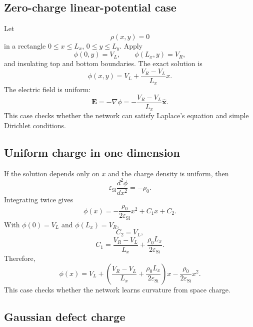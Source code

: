 \documentclass[11pt]{article}
\newcommand{\Evec}{\mathbf{E}}
\newcommand{\epss}{\varepsilon_{\mathrm{Si}}}
\begin{document}
\subsection{Zero-charge linear-potential case}

Let
\begin{equation}
\rho(x,y)=0
\end{equation}
in a rectangle $0\le x\le L_x$, $0\le y\le L_y$. Apply
\begin{equation}
\phi(0,y)=V_L,
\qquad
\phi(L_x,y)=V_R,
\end{equation}
and insulating top and bottom boundaries. The exact solution is
\begin{equation}
\phi(x,y)=V_L+\frac{V_R-V_L}{L_x}x.
\end{equation}
The electric field is uniform:
\begin{equation}
\Evec=-\nabla\phi=-\frac{V_R-V_L}{L_x}\hat{\bm{x}}.
\end{equation}
This case checks whether the network can satisfy Laplace's equation and simple Dirichlet conditions.

\subsection{Uniform charge in one dimension}

If the solution depends only on $x$ and the charge density is uniform, then
\begin{equation}
\epss\frac{d^2\phi}{dx^2}=-\rho_0.
\end{equation}
Integrating twice gives
\begin{equation}
\phi(x)=-\frac{\rho_0}{2\epss}x^2+C_1x+C_2.
\end{equation}
With $\phi(0)=V_L$ and $\phi(L_x)=V_R$,
\begin{equation}
C_2=V_L,
\end{equation}
\begin{equation}
C_1=\frac{V_R-V_L}{L_x}+\frac{\rho_0 L_x}{2\epss}.
\end{equation}
Therefore,
\begin{equation}
\phi(x)=V_L+\left(\frac{V_R-V_L}{L_x}+\frac{\rho_0L_x}{2\epss}\right)x-\frac{\rho_0}{2\epss}x^2.
\label{eq:uniform_charge_analytic}
\end{equation}
This case checks whether the network learns curvature from space charge.

\subsection{Gaussian defect charge}
\end{document}
